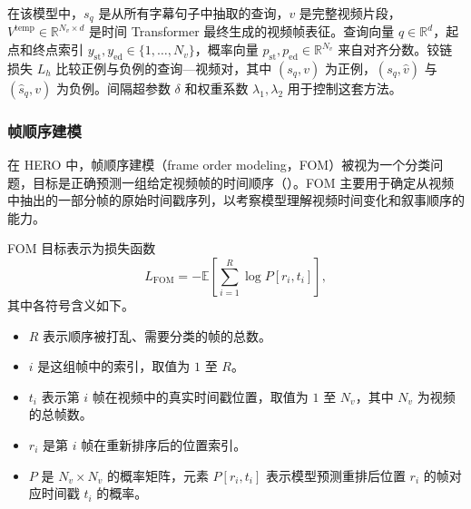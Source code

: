 在该模型中，$s_q$ 是从所有字幕句子中抽取的查询，$v$ 是完整视频片段，$V^{\mathrm{temp}}\in\mathbb{R}^{N_v\times d}$ 是时间 Transformer 最终生成的视频帧表征。查询向量 $q\in\mathbb{R}^d$，起点和终点索引 $y_{\mathrm{st}},y_{\mathrm{ed}}\in\{1,\ldots,N_v\}$，概率向量 $p_{\mathrm{st}},p_{\mathrm{ed}}\in\mathbb{R}^{N_v}$ 来自对齐分数。铰链损失 $L_h$ 比较正例与负例的查询—视频对，其中 $(s_q,v)$ 为正例，$(s_q,\hat{v})$ 与 $(\hat{s}_q,v)$ 为负例。间隔超参数 $\delta$ 和权重系数 $\lambda_1,\lambda_2$ 用于控制这套方法。

\subsubsection{帧顺序建模}
在 HERO 中，帧顺序建模（frame order modeling，FOM）被视为一个分类问题，目标是正确预测一组给定视频帧的时间顺序（）。FOM 主要用于确定从视频中抽出的一部分帧的原始时间戳序列，以考察模型理解视频时间变化和叙事顺序的能力。

FOM 目标表示为损失函数
\begin{equation}
L_{\mathrm{FOM}}=-\mathbb{E}\left[\sum_{i=1}^{R}\log P[r_i,t_i]\right],
\label{eq:ch09-frame-order-loss}
\end{equation}
其中各符号含义如下。
\begin{itemize}
\item $R$ 表示顺序被打乱、需要分类的帧的总数。
\item $i$ 是这组帧中的索引，取值为 $1$ 至 $R$。
\item $t_i$ 表示第 $i$ 帧在视频中的真实时间戳位置，取值为 $1$ 至 $N_v$，其中 $N_v$ 为视频的总帧数。
\item $r_i$ 是第 $i$ 帧在重新排序后的位置索引。
\item $P$ 是 $N_v\times N_v$ 的概率矩阵，元素 $P[r_i,t_i]$ 表示模型预测重排后位置 $r_i$ 的帧对应时间戳 $t_i$ 的概率。
\end{itemize}
